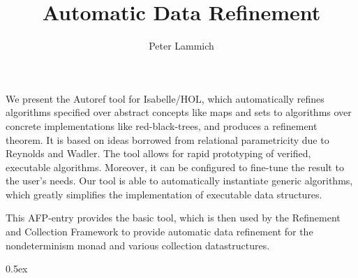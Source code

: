 \documentclass[11pt,a4paper]{book}
\makeatletter
\newenvironment{abstract}{%
  \small
  \begin{center}%
    {\bfseries \abstractname\vspace{-.5em}\vspace{\z@}}%
  \end{center}%
  \quotation}{\endquotation}
\makeatother
\begin{document}
\title{Automatic Data Refinement}
\author{Peter Lammich}
\maketitle

\begin{abstract}
We present the Autoref tool for Isabelle/HOL, which automatically
refines algorithms specified over abstract concepts like maps
and sets to algorithms over concrete implementations like red-black-trees,
and produces a refinement theorem. It is based on ideas borrowed from
relational parametricity due to Reynolds and Wadler.
The tool allows for rapid prototyping of verified, executable algorithms.
Moreover, it can be configured to fine-tune the result to the user's needs.
Our tool is able to automatically instantiate generic algorithms, which
greatly simplifies the implementation of executable data structures.

This AFP-entry provides the basic tool, which is then used by the 
Refinement and Collection Framework to provide automatic data refinement for
the nondeterminism monad and various collection datastructures.
\end{abstract}

\clearpage
\tableofcontents

\clearpage
\parindent 0pt\parskip 0.5ex


\end{document}
